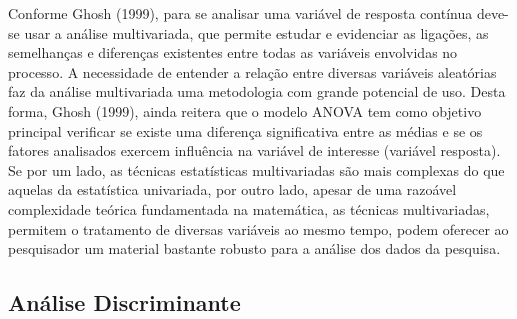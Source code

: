 Conforme Ghosh (1999), para se analisar uma variável de resposta contínua deve-se usar a análise multivariada, que permite estudar e evidenciar as ligações, as semelhanças e diferenças existentes entre todas as variáveis envolvidas no processo.  A necessidade de entender a relação entre diversas variáveis aleatórias faz da análise multivariada uma metodologia com grande potencial de uso.\newline
\indent Desta forma, Ghosh (1999), ainda reitera que o modelo ANOVA tem como objetivo principal verificar se existe uma diferença significativa entre as médias e se os fatores analisados exercem influência na variável de interesse (variável resposta).\newline
\indent Se por um lado, as técnicas estatísticas multivariadas são mais complexas do que aquelas da estatística univariada, por outro lado, apesar de uma razoável complexidade teórica fundamentada na matemática, as técnicas multivariadas, permitem o tratamento de diversas variáveis ao mesmo tempo, podem oferecer ao pesquisador um material bastante robusto para a análise dos dados da pesquisa.

\subsection{Análise Discriminante} \label{Analise Discriminante}

